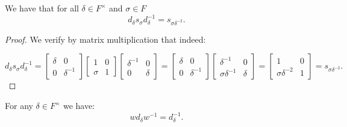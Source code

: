 \begin{lemma}
\label{SpecialMatrices.d_mul_s_mul_d_inv_eq_s}
\leanok
    We have that for all $\delta \in F^\times$ and $\sigma \in F$
    \[
    d_\delta s_\sigma d^{-1}_\delta = s_{\sigma \delta^{-2}}.
    \]
\end{lemma}

\begin{proof}
    We verify by matrix multiplication that indeed:

    \begin{equation*}
        d_\delta s_\sigma d^{-1}_\delta = \! \begin{bmatrix} \delta & 0 \\ 0 & \delta^{-1} \end{bmatrix} \begin{bmatrix} 1 & 0 \\ \sigma & 1 \end{bmatrix} \begin{bmatrix} \delta^{-1} & 0 \\ 0 & \delta \end{bmatrix} = \begin{bmatrix} \delta & 0 \\ 0 & \delta^{-1} \end{bmatrix} \! \begin{bmatrix} \delta^{-1} & 0 \\ \sigma \delta^{-1} & \delta \end{bmatrix} \! = \! \begin{bmatrix} 1 & 0 \\ \sigma \delta^{-2} & 1 \end{bmatrix} \! = s_{\sigma \delta^{-2}}.
    \end{equation*}
\end{proof}



\begin{lemma}
\label{SpecialMatrices.w_mul_d_eq_d_inv_w}
\leanok
For any $\delta \in F^\times$ we have:
\[ 
w d_\delta w^{-1} = d^{-1}_\delta.
\]
\end{lemma}

